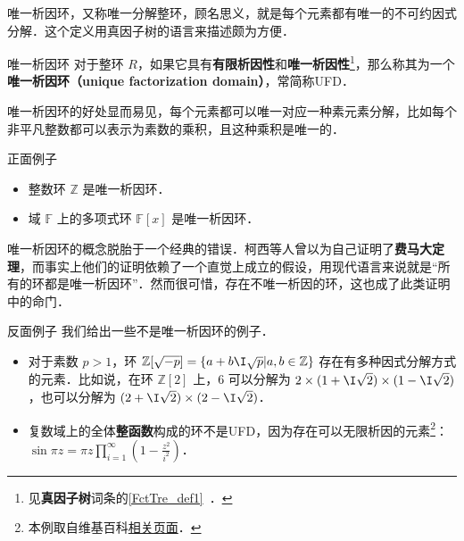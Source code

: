 


唯一析因环，又称唯一分解整环，顾名思义，就是每个元素都有唯一的不可约因式分解．这个定义用真因子树的语言来描述颇为方便．

\begin{definition}{唯一析因环}
对于整环 $R$，如果它具有\textbf{有限析因性}和\textbf{唯一析因性}\footnote{见\textbf{真因子树}词条的\autoref{FctTre_def1}~．}，那么称其为一个\textbf{唯一析因环（unique factorization domain）}，常简称UFD．
\end{definition}

唯一析因环的好处显而易见，每个元素都可以唯一对应一种素元素分解，比如每个非平凡整数都可以表示为素数的乘积，且这种乘积是唯一的．

\begin{example}{正面例子}
\begin{itemize}
\item 整数环 $\mathbb{Z}$ 是唯一析因环．
\item 域 $\mathbb{F}$ 上的多项式环 $\mathbb{F}[x]$ 是唯一析因环．
\end{itemize}
\end{example}

唯一析因环的概念脱胎于一个经典的错误．柯西等人曾以为自己证明了\textbf{费马大定理}，而事实上他们的证明依赖了一个直觉上成立的假设，用现代语言来说就是“所有的环都是唯一析因环”．然而很可惜，存在不唯一析因的环，这也成了此类证明中的命门．

\begin{example}{反面例子}
我们给出一些不是唯一析因环的例子．
\begin{itemize}
\item 对于素数 $p>1$，环 $\mathbb{Z}[\sqrt{-p}]=\{a+b\I\sqrt{p}|a, b\in\mathbb{Z}\}$ 存在有多种因式分解方式的元素．比如说，在环 $\mathbb{Z}[2]$ 上，$6$ 可以分解为 $2\times (1+\I\sqrt{2})\times(1-\I\sqrt{2})$，也可以分解为 $(2+\I\sqrt{2})\times(2-\I\sqrt{2})$．
\item 复数域上的全体\textbf{整函数}构成的环不是UFD，因为存在可以无限析因的元素\footnote{本例取自维基百科\href{https://en.wikipedia.org/wiki/Unique_factorization_domain}{相关页面}．}：$\sin{\pi z=\pi z\prod\limits_{i=1}^\infty(1-\frac{z^2}{i^2})}$．
\end{itemize}
\end{example}

